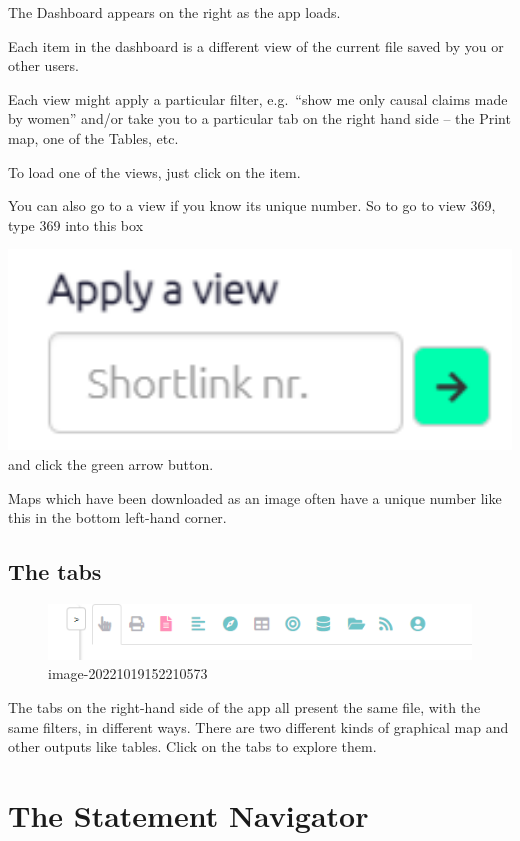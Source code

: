 \documentclass[
]{book}
\begin{document}
The Dashboard appears on the right as the app loads.

Each item in the dashboard is a different view of the current file saved by you or other users.

Each view might apply a particular filter, e.g.~``show me only causal claims made by women'' and/or take you to a particular tab on the right hand side -- the Print map, one of the Tables, etc.

To load one of the views, just click on the item.

You can also go to a view if you know its unique number. So to go to view 369, type 369 into this box

\includegraphics[width=6.77083in,height=\textheight]{_assets/image-20220808114935730.png} and click the green arrow button.

Maps which have been downloaded as an image often have a unique number like this in the bottom left-hand corner.

\hypertarget{the-tabs}{%
\section{The tabs}\label{the-tabs}}

\begin{figure}
\centering
\includegraphics{_assets/image-20221019152210573.png}
\caption{image-20221019152210573}
\end{figure}

The tabs on the right-hand side of the app all present the same file, with the same filters, in different ways. There are two different kinds of graphical map and other outputs like tables. Click on the tabs to explore them.

\hypertarget{xstatement-nav-old}{%
\chapter{The Statement Navigator}\label{xstatement-nav-old}}
\end{document}
